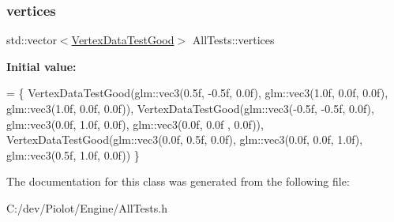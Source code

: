 \subsubsection{\texorpdfstring{vertices}{vertices}}
{\footnotesize\ttfamily std\+::vector$<$\mbox{\hyperlink{struct_all_tests_1_1_vertex_data_test_good}{Vertex\+Data\+Test\+Good}}$>$ All\+Tests\+::vertices}

{\bfseries Initial value\+:}
\begin{DoxyCode}
= \{
        VertexDataTestGood(glm::vec3(0.5f, -0.5f, 0.0f), glm::vec3(1.0f, 0.0f, 0.0f), glm::vec3(1.0f, 0.0f,
       0.0f)),
        VertexDataTestGood(glm::vec3(-0.5f, -0.5f, 0.0f), glm::vec3(0.0f, 1.0f, 0.0f), glm::vec3(0.0f, 0.0f
      , 0.0f)),
        VertexDataTestGood(glm::vec3(0.0f, 0.5f, 0.0f), glm::vec3(0.0f, 0.0f, 1.0f), glm::vec3(0.5f, 1.0f, 
      0.0f))
    \}
\end{DoxyCode}


The documentation for this class was generated from the following file\+:\begin{DoxyCompactItemize}
\item 
C\+:/dev/\+Piolot/\+Engine/All\+Tests.\+h\end{DoxyCompactItemize}
